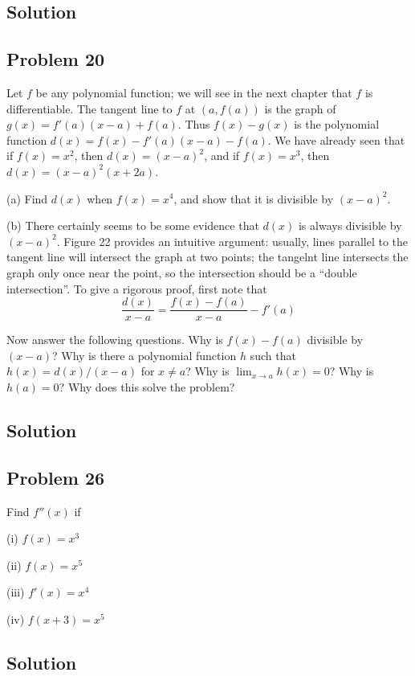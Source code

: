 \subsection*{Solution}

\subsection*{Problem 20}
Let $f$ be any polynomial function; we will see in the next chapter
that $f$ is differentiable. The tangent line to $f$ at $(a, f(a))$ is
the graph of $g(x)=f'(a)(x-a)+f(a)$. Thus $f(x)-g(x)$ is the
polynomial function $d(x)=f(x)-f'(a)(x-a)-f(a)$. We have already seen
that if $f(x)=x^2$, then $d(x)=(x-a)^2$, and if $f(x)=x^3$, then
$d(x)=(x-a)^2(x+2a)$.

\vs

(a) Find $d(x)$ when $f(x)=x^{4}$, and show that it is divisible by
$(x-a)^2$.

\vs

(b) There certainly seems to be some evidence that $d(x)$ is always
divisible by $(x-a)^2$. Figure 22 provides an intuitive argument:
usually, lines parallel to the tangent line will intersect the graph
at two points; the tangelnt line intersects the graph only once near
the point, so the intersection should be a ``double intersection''. To
give a rigorous proof, first note that
\[\frac{d(x)}{x-a}=\frac{f(x)-f(a)}{x-a}-f'(a)\]

Now answer the following questions. Why is $f(x)-f(a)$ divisible by
$(x-a)$? Why is there a polynomial function $h$ such that
$h(x)=d(x)/(x-a)$ for $x\neq a$? Why is $\lim_{x\to a}h(x)=0$? Why is
$h(a)=0$? Why does this solve the problem?

\subsection*{Solution}

\subsection*{Problem 26}
Find $f''(x)$ if

\vs

(i) $f(x)=x^3$

\vs

(ii) $f(x)=x^5$

\vs

(iii) $f'(x)=x^4$

\vs

(iv) $f(x+3)=x^5$


\subsection*{Solution}


